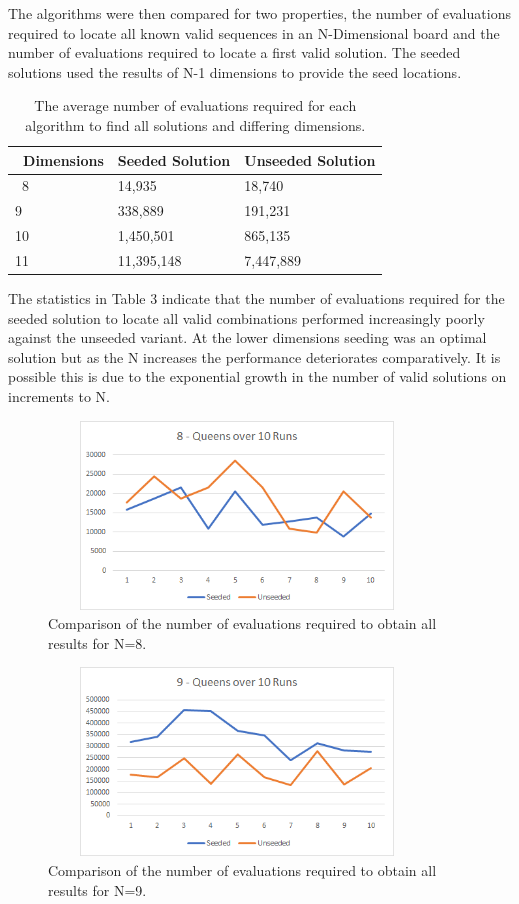 \documentclass[conference]{IEEEtran}
\begin{document}
The algorithms were then compared for two properties, the number of evaluations required to locate all known valid sequences in an N-Dimensional board and the number of evaluations required to locate a first valid solution. The seeded solutions used the results of N-1 dimensions to provide the seed locations.

\begin{table}[ht]
	\begin{tabular}{|p{2cm}|p{6cm}|p{6cm}|} 
		\hline\
		Dimensions & Seeded Solution & Unseeded Solution \\
		\hline\
		8 & 14,935 & 18,740 \\
		9 & 338,889 & 191,231 \\
		10 & 1,450,501 & 865,135 \\
		11 & 11,395,148 & 7,447,889 \\
		\hline
	\end{tabular}
\caption{The average number of evaluations required for each algorithm to find all solutions and differing dimensions.}
\end{table}

The statistics in Table 3 indicate that the number of evaluations required for the seeded solution to locate all valid combinations performed increasingly poorly against the unseeded variant. At the lower dimensions seeding was an optimal solution but as the N increases the performance deteriorates comparatively. It is possible this is due to the exponential growth in the number of valid solutions on increments to N. 

\begin{figure}[!htbp]
	\centering	
	\includegraphics[width=10cm, height=5cm]{8QueensAllValues}
	\caption{Comparison of the number of evaluations required to obtain all results for N=8.}
\end{figure}

\begin{figure}[!htbp]
	\centering	
	\includegraphics[width=10cm, height=5cm]{9QueensAllValues}
		\caption{Comparison of the number of evaluations required to obtain all results for N=9.}
\end{figure}
\end{document}
